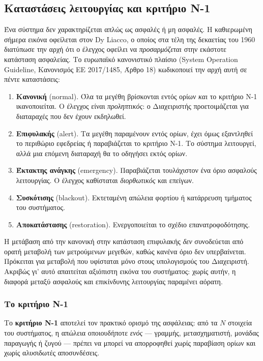 \subsection{Καταστάσεις λειτουργίας και κριτήριο N-1}

Ένα σύστημα δεν χαρακτηρίζεται απλώς ως ασφαλές ή μη ασφαλές. Η καθιερωμένη σήμερα εικόνα
οφείλεται στον Dy Liacco, ο οποίος στα τέλη της δεκαετίας του 1960 διατύπωσε την αρχή ότι
ο έλεγχος οφείλει να \emph{προσαρμόζεται} στην εκάστοτε κατάσταση ασφαλείας. Το ευρωπαϊκό
κανονιστικό πλαίσιο (System Operation Guideline, Κανονισμός ΕΕ 2017/1485, Άρθρο 18)
κωδικοποιεί την αρχή αυτή σε πέντε καταστάσεις:

\begin{enumerate}
\item \textbf{Κανονική} (normal). Όλα τα μεγέθη βρίσκονται εντός ορίων \emph{και} το
      κριτήριο N-1 ικανοποιείται. Ο έλεγχος είναι \emph{προληπτικός}: ο Διαχειριστής
      προετοιμάζεται για διαταραχές που δεν έχουν εκδηλωθεί.
\item \textbf{Επιφυλακής} (alert). Τα μεγέθη παραμένουν εντός ορίων, έχει όμως εξαντληθεί
      το περιθώριο εφεδρείας ή παραβιάζεται το κριτήριο N-1. Το σύστημα λειτουργεί, αλλά
      μια επόμενη διαταραχή θα το οδηγήσει εκτός ορίων.
\item \textbf{Έκτακτης ανάγκης} (emergency). Παραβιάζεται τουλάχιστον ένα όριο ασφαλούς
      λειτουργίας. Ο έλεγχος καθίσταται \emph{διορθωτικός} και επείγων.
\item \textbf{Συσκότισης} (blackout). Εκτεταμένη απώλεια φορτίου ή κατάρρευση τμήματος του
      συστήματος.
\item \textbf{Αποκατάστασης} (restoration). Ενεργοποιείται το σχέδιο επανατροφοδότησης.
\end{enumerate}

Η μετάβαση από την κανονική στην κατάσταση επιφυλακής \emph{δεν} συνοδεύεται από ορατή
μεταβολή των μετρούμενων μεγεθών, καθώς κανένα όριο δεν υπερβαίνεται. Πρόκειται για
μεταβολή που υφίσταται μόνο στους υπολογισμούς του Διαχειριστή. Ακριβώς γι' αυτό απαιτείται
αξιόπιστη εικόνα του συστήματος: χωρίς αυτήν, η διαφορά μεταξύ ασφαλούς και επικίνδυνης
λειτουργίας παραμένει αόρατη.

\subsubsection*{Το κριτήριο N-1}

Το \textbf{κριτήριο N-1} αποτελεί τον πρακτικό ορισμό της ασφάλειας: από τα $N$ στοιχεία
του συστήματος, η απώλεια οποιουδήποτε \emph{ενός} — γραμμής, μετασχηματιστή, μονάδας
παραγωγής ή ζυγού — πρέπει να μπορεί να απορροφηθεί χωρίς παραβίαση ορίων και χωρίς
αλυσιδωτές αποσυνδέσεις.

